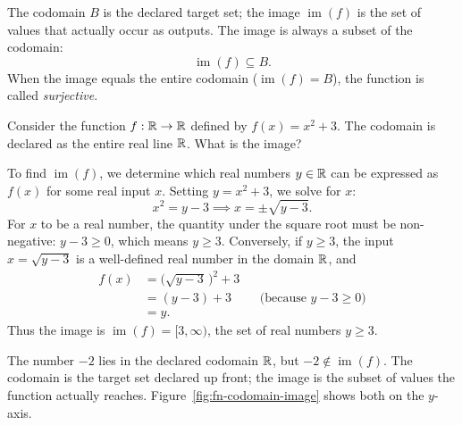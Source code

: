 The codomain $B$ is the declared target set; the image $\operatorname{im}(f)$ is the set of values that actually occur as outputs. The image is always a subset of the codomain:
\[
\operatorname{im}(f) \subseteq B.
\]
When the image equals the entire codomain ($\operatorname{im}(f) = B$), the function is called \emph{surjective}.

\begin{example}
Consider the function $f: \mathbb{R} \to \mathbb{R}$ defined by $f(x) = x^2 + 3$. The codomain is declared as the entire real line $\mathbb{R}$. What is the image?

To find $\operatorname{im}(f)$, we determine which real numbers $y \in \mathbb{R}$ can be expressed as $f(x)$ for some real input $x$.
Setting $y = x^2 + 3$, we solve for $x$:
\[
x^2 = y - 3 \implies x = \pm\sqrt{y - 3}.
\]
For $x$ to be a real number, the quantity under the square root must be non-negative: $y - 3 \ge 0$, which means $y \ge 3$. 
Conversely, if $y \ge 3$, the input $x = \sqrt{y - 3}$ is a well-defined real number in the domain $\mathbb{R}$, and
\begin{align*}
f(x) &= \bigl(\sqrt{y - 3}\,\bigr)^2 + 3 \\
     &= (y - 3) + 3 && \text{(because } y - 3 \ge 0\text{)} \\
     &= y.
\end{align*}
Thus the image is $\operatorname{im}(f) = [3, \infty)$, the set of real numbers $y \ge 3$. 

The number $-2$ lies in the declared codomain $\mathbb{R}$, but $-2 \notin \operatorname{im}(f)$. The codomain is the target set declared up front; the image is the subset of values the function actually reaches. Figure~\ref{fig:fn-codomain-image} shows both on the $y$-axis.
\end{example}

